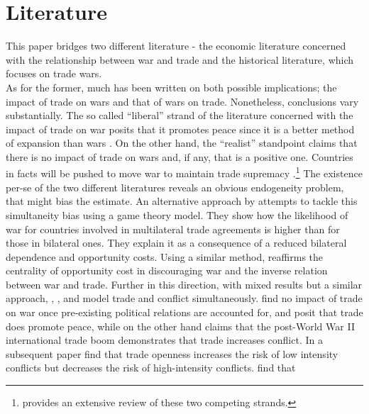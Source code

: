 \documentclass[12pt,a4paper,notitlepage,english]{article}
\begin{document}
\section{Literature} \label{literature}
This paper bridges two different literature - the economic literature concerned with the relationship between war and trade and the historical literature, which focuses on trade wars. \\
As for the former, much has been written on both possible implications; the impact of trade on wars and that of wars on trade. Nonetheless, conclusions vary substantially. The so called ``liberal'' strand of the literature concerned with the impact of trade on war posits that it promotes peace since it is a better method of expansion than wars \citep{Doyle1997,Oneal1997,Polachek1980}. On the other hand, the ``realist'' standpoint claims that there is no impact of trade on wars and, if any, that is a positive one. Countries in facts will be pushed to move war to maintain trade supremacy \citep{Ripsman1996,Levy1990,Buzan1984}.\footnote{\cite{Mcmillan1997} provides an extensive review of these two competing strands.} 
The existence per-se of the two different literatures reveals an obvious endogeneity problem, that might bias the estimate. An alternative approach by \cite{Martin2008} attempts to tackle this simultaneity bias using a game theory model. They show how the likelihood of war for countries involved in multilateral trade agreements is higher than for those in bilateral ones. They explain it as a consequence of a reduced bilateral dependence and opportunity costs. Using a similar method, \cite{polachek2010opportunity} reaffirms the centrality of opportunity cost in discouraging war and the inverse relation between war and trade. Further in this direction, with mixed results but a similar approach, \cite{keshk2004trade}, \cite{hegre2010trade}, \cite{goenner2011simultaneity} and \cite{leonard2020containing} model trade and conflict simultaneously. \cite{keshk2004trade} find no impact of trade on war once pre-existing political relations are accounted for, \cite{hegre2010trade} and \cite{goenner2011simultaneity} posit that trade does promote peace, while \cite{leonard2020containing} on the other hand claims that the post-World War II international trade boom demonstrates that trade increases conflict. In a subsequent paper \cite{martin2008civil} find that trade openness increases the risk of low intensity conflicts but decreases the risk of high-intensity conflicts. \cite{feldman2020naval} find that 
\end{document}
